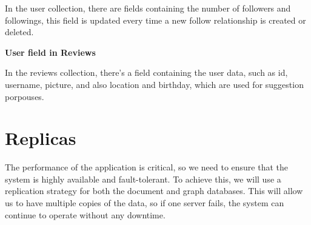 In the user collection, there are fields containing the number of followers and followings, this field is updated every time a new follow relationship is created or deleted.


\textbf{User field in Reviews}


In the reviews collection, there's a field containing the user data, such as id, username, picture, and also location and birthday, which are used for suggestion porpouses.

\section{Replicas}
The performance of the application is critical, so we need to ensure that the system is highly available and fault-tolerant. To achieve this, we will use a replication strategy for both the document and graph databases. This will allow us to have multiple copies of the data, so if one server fails, the system can continue to operate without any downtime.


